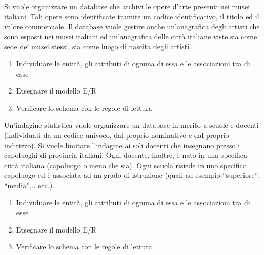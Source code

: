 \documentclass[addpoints]{exam}
\begin{document}
 
\begin{center}
\end{center}
 
\vspace{5mm}
 
 
\vspace{5mm}
 
 
\begin{questions}
	
\question[5] 	Si vuole organizzare un database che archivi le opere d’arte presenti nei musei italiani. Tali opere sono identificate tramite un codice identificativo, il titolo ed il valore commerciale. Il database vuole gestire anche un’anagrafica degli artisti che sono esposti nei musei italiani ed un’anagrafica delle città italiane viste sia come sede dei musei stessi, sia come luogo di nascita degli artisti.
\begin{enumerate}
	\item Individuare le entità, gli attributi di ognuna di essa e le associazioni tra di esse
	\item Disegnare il modello E/R
	\item Verificare lo schema con le regole di lettura
\end{enumerate}
 
\question[5] 		Un’indagine statistica vuole organizzare un database in merito a scuole e docenti (individuati da un codice univoco, dal proprio nominativo e dal proprio indirizzo). Si vuole limitare l’indagine ai soli docenti che insegnano presso i capoluoghi di provincia italiani. Ogni docente, inoltre, è nato in una specifica città italiana (capoluogo o meno che sia). Ogni scuola risiede in uno specifico capoluogo ed è associata ad un grado di istruzione (quali ad esempio “superiore”, “media”,.. ecc.).
\begin{enumerate}
	\item Individuare le entità, gli attributi di ognuna di essa e le associazioni tra di esse
	\item Disegnare il modello E/R
	\item Verificare lo schema con le regole di lettura
\end{enumerate}

\end{questions}

\begin{center}
	\gradetable[h][questions]
\end{center}
\end{document}
